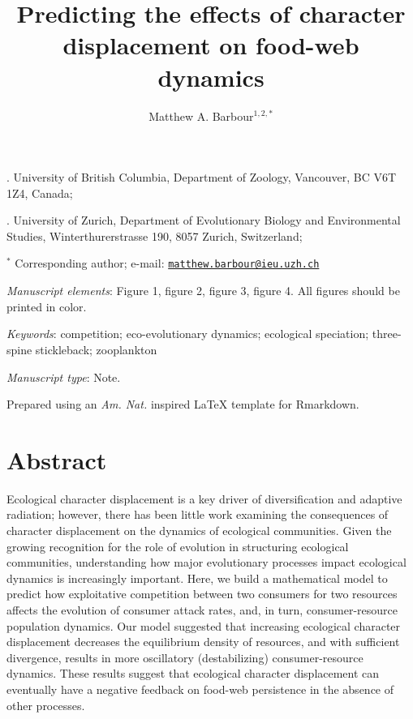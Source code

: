 \documentclass[11pt,]{article}
\title{Predicting the effects of character displacement on food-web dynamics}
\author{Matthew A. Barbour\(^{1,2,\ast}\)}
\date{}
\begin{document}
\maketitle


. University of British Columbia, Department of Zoology,
Vancouver, BC V6T 1Z4, Canada;

. University of Zurich, Department of Evolutionary Biology
and Environmental Studies, Winterthurerstrasse 190, 8057 Zurich,
Switzerland;

\(^\ast\) Corresponding author; e-mail:
\href{mailto:matthew.barbour@ieu.uzh.ch}{\nolinkurl{matthew.barbour@ieu.uzh.ch}}

\bigskip

\emph{Manuscript elements}: Figure 1, figure 2, figure 3, figure 4. All
figures should be printed in color.

\bigskip

\emph{Keywords}: competition; eco-evolutionary dynamics; ecological
speciation; three-spine stickleback; zooplankton

\bigskip

\emph{Manuscript type}: Note.

\bigskip

\footnotesize Prepared using an \emph{Am. Nat.} inspired \LaTeX{}
template for Rmarkdown. \normalsize

\linenumbers{} \modulolinenumbers[3]

\newpage

\section{Abstract}\label{abstract}

Ecological character displacement is a key driver of diversification and
adaptive radiation; however, there has been little work examining the
consequences of character displacement on the dynamics of ecological
communities. Given the growing recognition for the role of evolution in
structuring ecological communities, understanding how major evolutionary
processes impact ecological dynamics is increasingly important. Here, we
build a mathematical model to predict how exploitative competition
between two consumers for two resources affects the evolution of
consumer attack rates, and, in turn, consumer-resource population
dynamics. Our model suggested that increasing ecological character
displacement decreases the equilibrium density of resources, and with
sufficient divergence, results in more oscillatory (destabilizing)
consumer-resource dynamics. These results suggest that ecological
character displacement can eventually have a negative feedback on
food-web persistence in the absence of other processes.
\end{document}
